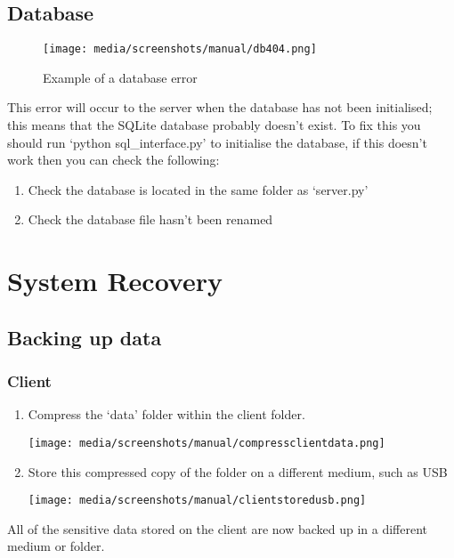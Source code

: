 \documentclass[12pt,a4paper]{report}
\begin{document}
    \subsection{Database}
        \begin{figure}[H]
        \centering
        \caption{Example of a database error}
        \label{fig:db404}
            \texttt{[image: media/screenshots/manual/db404.png]}
    \end{figure} 
    This error will occur to the server when the database has not been initialised; this means that the SQLite database probably doesn't exist.
    To fix this you should run `python sql\_interface.py' to initialise the database, if this doesn't work then you can check the following:
    \begin{enumerate}
        \item Check the database is located in the same folder as `server.py'
        \item Check the database file hasn't been renamed
    \end{enumerate}
\newpage
\section{System Recovery}
    \subsection{Backing up data}
        \subsubsection{Client}
            \begin{enumerate}
                \item Compress the `data' folder within the client folder.
                \begin{center}
                \texttt{[image: media/screenshots/manual/compressclientdata.png]}
                \end{center}
                \item Store this compressed copy of the folder on a different medium, such as USB
                \begin{center}
                \texttt{[image: media/screenshots/manual/clientstoredusb.png]}
                \end{center}
            \end{enumerate}
            All of the sensitive data stored on the client are now backed up in a different medium or folder.
        \newpage
\end{document}
